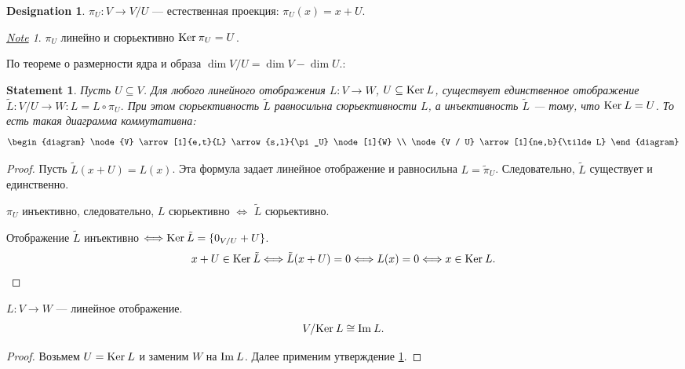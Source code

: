 \documentclass[11pt]{book}
\newcommand{\im}{{\mathop{\text{\rm Im}}}\:}
\renewcommand{\ker}{{\mathop{\text{\rm Ker}}}\:}
\theoremstyle{definition}
\theoremstyle{plain}
\theoremstyle{plain}
\newtheorem{st}{Statement}
\theoremstyle{definition}
\newtheorem*{name}{Designation}
\theoremstyle{remark}
\newtheorem*{note}{\underline{Note}}
\begin{document}
\begin{name}
    $ \pi_U: V \to  V / U$ ---  естественная проекция: $ \pi_U(x) = x + U$.
    \begin{note}
	$ \pi_U$ линейно и сюрьективно  $ \ker \pi_U = U$.

	По теореме о размерности ядра и образа
	$\dim V / U = \dim V - \dim U $.:
    \end{note}
\end{name}
\begin{st}\label{st_l_ker}
    Пусть $ U \subseteq V$. Для любого линейного отображения $ L: V \to W$, $ U \subseteq \ker L$, существует единственное отображение $ \tilde L: V / U \to  W: L = L \circ \pi_U$.
    При этом сюрьективность  $ \tilde L$  равносильна сюрьективности $ L$, а инъективность  $ \tilde L$ --- тому, что  $ \ker L = U$.
    То есть такая диаграмма коммутативна:
    $$
    \begin{diagram}
	\node{V} \arrow[1]{e,t}{L}
	\arrow{s,l}{\pi_U}
	\node[1]{W} \\
	\node{V / U} \arrow[1]{ne,b}{\tilde L}
    \end{diagram}
    $$
\end{st}
\begin{proof}
    Пусть $ \tilde L(x + U) = L(x)$. Эта формула задает линейное отображение и равносильна $ L = \tilde \pi_U$. Следовательно, $ \tilde L$ существует и единственно.

    $ \pi_U$  инъективно, следовательно, $ L$ сюрьективно  $ \Longleftrightarrow $ $ \tilde L$ сюрьективно.

    Отображение  $ \tilde L$ инъективно  $ \Longleftrightarrow \ker \tilde L = \{0_{V / U} + U\}$.
    \[
	x + U \in \ker \tilde L \Longleftrightarrow \tilde L(x + U) = 0 \Longleftrightarrow L(x) = 0 \Longleftrightarrow x \in \ker L
    .\]
\end{proof}
\begin{thm}[о гомоморфизме]
    $L : V \to W$ --- линейное отображение.
    \[
	V / \ker L \cong \im L
    .\]
\end{thm}
\begin{proof}
    Возьмем $U = \ker L$ и заменим $W$ на $\im L$. Далее применим утверждение \ref{st_l_ker}.
\end{proof}
\end{document}
